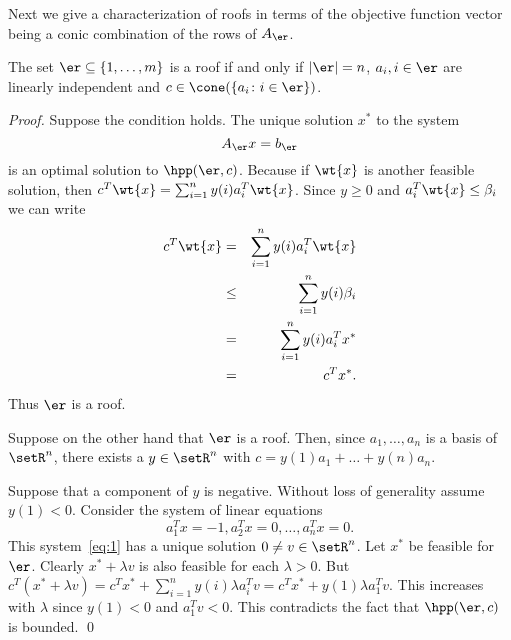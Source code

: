 


Next we give a characterization of roofs in terms of the objective
function vector being a conic combination of the rows of $A_\er$. 
\begin{lemma}
  \label{lem:4}
  The set $\er\subseteq\{1,\ldots,m\}$  is a roof
  if and only if  $|\er| =n$, $a_i, i \in \er$  are linearly independent and
  $c \in \cone(\{a_i\colon i \in \er\})$. 
\end{lemma}

\begin{proof}
  Suppose the condition holds. The unique solution $x^*$  to the
  system 
  \begin{equation}
    \label{eq:0}
    A_\er x = b_\er 
  \end{equation}
  is an optimal solution to
  $\hpp(\er,c)$. Because if $\wt{x}$ is another feasible solution,
  then $c^T\wt{x} = \sum_{i=1}^n y(i)a_i^T \wt{x}$. Since $y \geq0$ and
  $a_i^T\wt{x}\leq\beta_i$  we can write
  \begin{eqnarray}
    \label{eq:2}
    c^T\wt{x} & = &  \sum_{i=1}^n y(i)a_i^T  \wt{x}\\
             & \leq & \sum_{i=1}^n y(i) \beta_i \\
             & = &  \sum_{i=1}^n y(i) a_i^Tx^*\\
             & = & c^Tx^*.
  \end{eqnarray}
   Thus $\er$ is a roof. 

  Suppose on the other hand that $\er$ is a roof. Then, since
  $a_1,\ldots,a_n$ is a basis of $\setR^n$, there exists a $y\in \setR^n$ with 
  $c =  y(1)a_1+\ldots+y(n)a_n$. 
  
  Suppose that a component of $y$ is negative. Without loss of
  generality assume  $y(1)<0$. Consider the system of linear equations
  \begin{equation}
    \label{eq:1}
    a_1^Tx = -1,a_2^Tx=0,\ldots,a_n^Tx = 0.
  \end{equation}
  This system~\eqref{eq:1} has a unique solution $0\neq v\in \setR^n$.  
  Let $x^*$ be feasible for $\er$. Clearly $x^* + \lambda v$ is also feasible for each
  $\lambda>0$. But $c^T (x^* + \lambda v) = c^Tx^* + \sum_{i=1}^n y(i) \lambda a_i^T  v = c^T x^*
  + y(1)\lambda  a_1^Tv$. This increases with $\lambda$ since $y(1)<0$ and
  $a_1^Tv<0$.  This contradicts the fact that $\hpp(\er,c)$ is
  bounded. 
\qed 
\end{proof}



